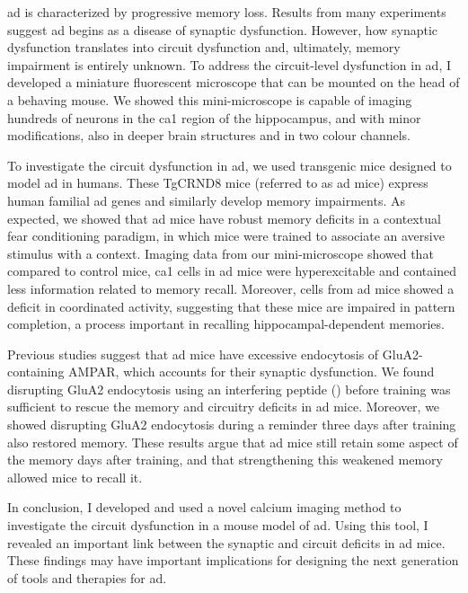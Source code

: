 \Gls{ad} is characterized by progressive memory loss. Results from many experiments suggest \gls{ad} begins as a disease of synaptic dysfunction. However, how synaptic dysfunction translates into circuit dysfunction and, ultimately, memory impairment is entirely unknown. To address the circuit-level dysfunction in \gls{ad}, I developed a miniature fluorescent microscope that can be mounted on the head of a behaving mouse. We showed this mini-microscope is capable of imaging hundreds of neurons in the \gls{ca1} region of the hippocampus, and with minor modifications, also in deeper brain structures and in two colour channels. 

To investigate the circuit dysfunction in \gls{ad}, we used transgenic mice designed to model \gls{ad} in humans. These TgCRND8 mice (referred to as \gls{ad} mice) express human familial \gls{ad} genes and similarly develop memory impairments. As expected, we showed that \gls{ad} mice have robust memory deficits in a contextual fear conditioning paradigm, in which mice were trained to associate an aversive stimulus with a context. Imaging data from our mini-microscope showed that compared to control mice, \gls{ca1} cells in \gls{ad} mice were hyperexcitable and contained less information related to memory recall. Moreover, cells from \gls{ad} mice showed a deficit in coordinated activity, suggesting that these mice are impaired in pattern completion, a process important in recalling hippocampal-dependent memories.

Previous studies suggest that \gls{ad} mice have excessive endocytosis of GluA2-containing AMPAR, which accounts for their synaptic dysfunction. We found disrupting GluA2 endocytosis using an interfering peptide (\tglu{}) before training was sufficient to rescue the memory and circuitry deficits in \gls{ad} mice. Moreover, we showed disrupting GluA2 endocytosis during a reminder three days after training also restored memory. These results argue that \gls{ad} mice still retain some aspect of the memory days after training, and that strengthening this weakened memory allowed mice to recall it.

In conclusion, I developed and used a novel calcium imaging method to investigate the circuit dysfunction in a mouse model of \gls{ad}. Using this tool, I revealed an important link between the synaptic and circuit deficits in \gls{ad} mice. These findings may have important implications for designing the next generation of tools and therapies for \gls{ad}.
